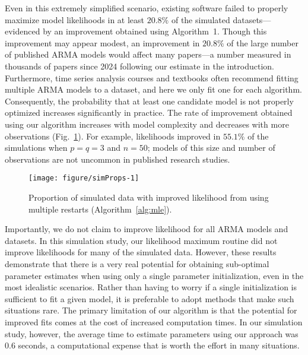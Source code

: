 Even in this extremely simplified scenario, existing software failed to properly maximize model likelihoods in at least $20.8\%$ of the simulated datasets---evidenced by an improvement obtained using Algorithm~1.
Though this improvement may appear modest, an improvement in $20.8\%$ of the large number of published ARMA models would affect many papers---a number measured in thousands of papers since 2024 following our estimate in the introduction.
Furthermore, time series analysis courses and textbooks often recommend fitting multiple ARMA models to a dataset, and here we only fit one for each algorithm. 
Consequently, the probability that at least one candidate model is not properly optimized increases significantly in practice.
The rate of improvement obtained using our algorithm increases with model complexity and decreases with more observations (Fig.~\ref{fig:simProps}).
For example, likelihoods improved in $55.1\%$ of the simulations when $p = q = 3$ and $n = 50$; models of this size and number of observations are not uncommon in published research studies.



\begin{figure}[!ht]
\begin{knitrout}
\color{fgcolor}

{\centering \texttt{[image: figure/simProps-1]} 

}


\end{knitrout}
\caption{\label{fig:simProps}Proportion of simulated data with improved likelihood from using multiple restarts (Algorithm~\ref{alg:mle}).}
\end{figure}

Importantly, we do not claim to improve likelihood for all ARMA models and datasets.
In this simulation study, our likelihood maximum routine did not improve likelihoods for many of the simulated data.
However, these results demonstrate that there is a very real potential for obtaining sub-optimal parameter estimates when using only a single parameter initialization, even in the most idealistic scenarios.
Rather than having to worry if a single initialization is sufficient to fit a given model, it is preferable to adopt methods that make such situations rare.
The primary limitation of our algorithm is that the potential for improved fits comes at the cost of increased computation times.
In our simulation study, however, the average time to estimate parameters using our approach was $0.6$ seconds, a computational expense that is worth the effort in many situations.

